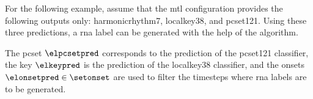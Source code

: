 
For the following example, assume that the \gls{mtl}
configuration provides the following outputs only:
\gls{harmonicrhythm7}, \gls{localkey38}, and \gls{pcset121}.
Using these three predictions, a \gls{rna} label can be
generated with the help of the \algorithmrn{} algorithm.

The \gls{pcset} $\elpcsetpred$ corresponds to the prediction
of the \gls{pcset121} classifier, the key $\elkeypred$ is
the prediction of the \gls{localkey38 classifier}, and the
onsets $\elonsetpred \in \setonset$ are used to filter the
timesteps where \gls{rna} labels are to be generated.
